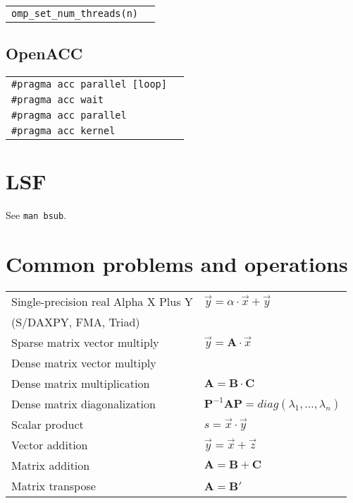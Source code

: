 \documentclass[11pt]{article}
\begin{document}
\begin{tabular}{ p{7cm} l }
	\lstinline$omp_set_num_threads(n)$ & \\
\end{tabular}

\subsection{OpenACC}

\begin{tabular}{ p{7cm} l }
	\lstinline$#pragma acc parallel [loop]$ & \\
	\lstinline$#pragma acc wait$ & \\
	\lstinline$#pragma acc parallel$ & \\
	\lstinline$#pragma acc kernel$ & \\
\end{tabular}

\section{LSF}

See \texttt{man bsub}.

\section{Common problems and operations}

\begin{tabular}{ p{7cm} l }
	Single-precision real Alpha X Plus Y & \( \vec{y} = \alpha \cdot \vec{x} + \vec{y} \) \\
	(S/DAXPY, FMA, Triad) & \\
	Sparse matrix vector multiply & \( \vec{y} = \mathbf{A} \cdot \vec{x} \) \\
	Dense matrix vector multiply & \\
	Dense matrix multiplication & \( \mathbf{A} = \mathbf{B} \cdot \mathbf{C} \) \\
	Dense matrix diagonalization & \( \mathbf{P}^{-1} \mathbf{A} \mathbf{P} = diag(\lambda_1, ..., \lambda_n) \) \\
	Scalar product & \( s = \vec{x} \cdot \vec{y} \) \\
	Vector addition & \( \vec{y} = \vec{x} + \vec{z} \) \\
	Matrix addition & \( \mathbf{A} = \mathbf{B} + \mathbf{C} \) \\
	Matrix transpose & \( \mathbf{A} = \mathbf{B}' \) \\
\end{tabular}
\end{document}
